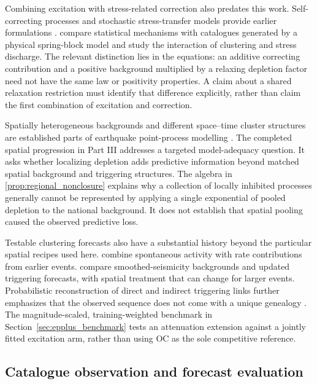 Combining excitation with stress-related correction also predates this work. Self-correcting processes and stochastic stress-transfer models provide earlier formulations \citep{IshamWestcott1979,BorovkovBebbington2003}. \citet{PetrilloZhuangLippiello2023} compare statistical mechanisms with catalogues generated by a physical spring-block model and study the interaction of clustering and stress discharge. The relevant distinction lies in the equations: an additive correcting contribution and a positive background multiplied by a relaxing depletion factor need not have the same law or positivity properties. A claim about a shared relaxation restriction must identify that difference explicitly, rather than claim the first combination of excitation and correction.

Spatially heterogeneous backgrounds and different space--time cluster structures are established parts of earthquake point-process modelling \citep{Ogata1998}. The completed spatial progression in Part III addresses a targeted model-adequacy question. It asks whether localizing depletion adds predictive information beyond matched spatial background and triggering structures. The algebra in \cref{prop:regional_nonclosure} explains why a collection of locally inhibited processes generally cannot be represented by applying a single exponential of pooled depletion to the national background. It does not establish that spatial pooling caused the observed predictive loss.

Testable clustering forecasts also have a substantial history beyond the
particular spatial recipes used here. \citet{ConsoleMurru2001} combine
spontaneous activity with rate contributions from earlier events.
\citet{HelmstetterKaganJackson2006,WernerEtAl2011} compare smoothed-seismicity
backgrounds and updated triggering forecasts, with spatial treatment that can
change for larger events. Probabilistic reconstruction of direct and indirect
triggering links further emphasizes that the observed sequence does not come
with a unique genealogy \citep{MarsanLengline2008}. The magnitude-scaled,
training-weighted benchmark in Section~\ref{sec:epplus_benchmark} tests an
attenuation extension against a jointly fitted excitation arm, rather than
using OC as the sole competitive reference.

\subsection{Catalogue observation and forecast evaluation}


